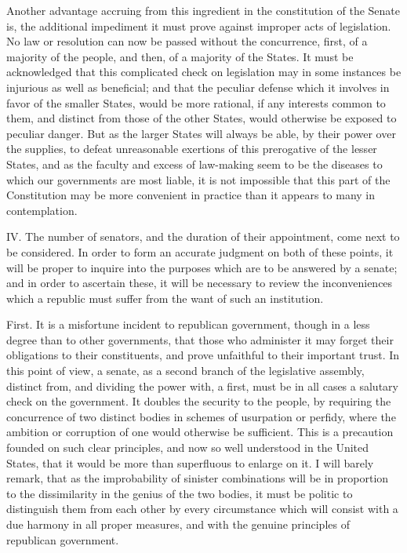 Another advantage accruing from this ingredient in the constitution of the Senate is, the additional impediment it must prove against improper acts of legislation. 
No law or resolution can now be passed without the concurrence, first, of a majority of the people, and then, of a majority of the States. 
It must be acknowledged that this complicated check on legislation may in some instances be injurious as well as beneficial; and that the peculiar defense which it involves in favor of the smaller States, would be more rational, if any interests common to them, and distinct from those of the other States, would otherwise be exposed to peculiar danger. 
But as the larger States will always be able, by their power over the supplies, to defeat unreasonable exertions of this prerogative of the lesser States, and as the faculty and excess of law-making seem to be the diseases to which our governments are most liable, it is not impossible that this part of the Constitution may be more convenient in practice than it appears to many in contemplation.

IV. 
The number of senators, and the duration of their appointment, come next to be considered. 
In order to form an accurate judgment on both of these points, it will be proper to inquire into the purposes which are to be answered by a senate; and in order to ascertain these, it will be necessary to review the inconveniences which a republic must suffer from the want of such an institution.

First. 
It is a misfortune incident to republican government, though in a less degree than to other governments, that those who administer it may forget their obligations to their constituents, and prove unfaithful to their important trust. 
In this point of view, a senate, as a second branch of the legislative assembly, distinct from, and dividing the power with, a first, must be in all cases a salutary check on the government. 
It doubles the security to the people, by requiring the concurrence of two distinct bodies in schemes of usurpation or perfidy, where the ambition or corruption of one would otherwise be sufficient. 
This is a precaution founded on such clear principles, and now so well understood in the United States, that it would be more than superfluous to enlarge on it. 
I will barely remark, that as the improbability of sinister combinations will be in proportion to the dissimilarity in the genius of the two bodies, it must be politic to distinguish them from each other by every circumstance which will consist with a due harmony in all proper measures, and with the genuine principles of republican government.

